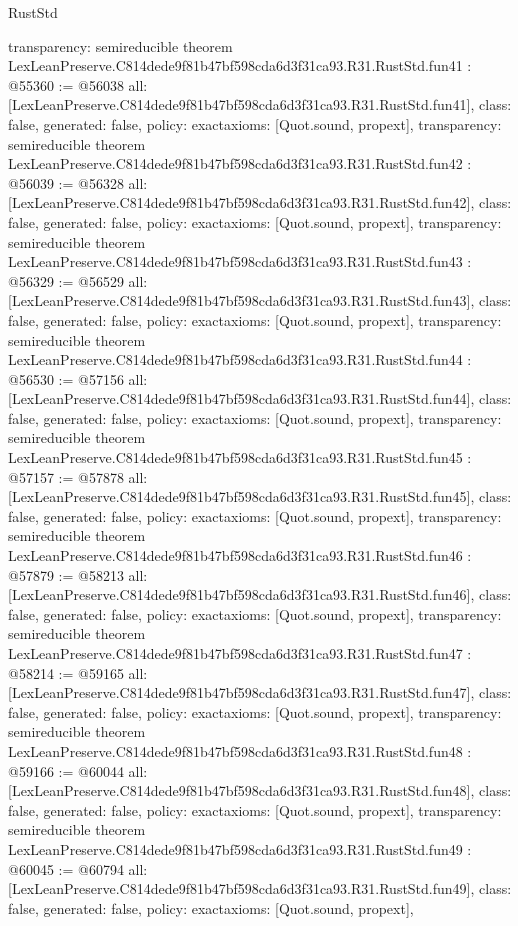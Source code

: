 \begin{lexlean}{RustStd}
\begin{coremodule}
{  transparency: semireducible
}
theorem LexLeanPreserve.C814dede9f81b47bf598cda6d3f31ca93.R31.RustStd.fun41 : @55360 := @56038 {
  all: [LexLeanPreserve.C814dede9f81b47bf598cda6d3f31ca93.R31.RustStd.fun41],
  class: false,
  generated: false,
  policy: exact{axioms: [Quot.sound, propext]},
  transparency: semireducible
}
theorem LexLeanPreserve.C814dede9f81b47bf598cda6d3f31ca93.R31.RustStd.fun42 : @56039 := @56328 {
  all: [LexLeanPreserve.C814dede9f81b47bf598cda6d3f31ca93.R31.RustStd.fun42],
  class: false,
  generated: false,
  policy: exact{axioms: [Quot.sound, propext]},
  transparency: semireducible
}
theorem LexLeanPreserve.C814dede9f81b47bf598cda6d3f31ca93.R31.RustStd.fun43 : @56329 := @56529 {
  all: [LexLeanPreserve.C814dede9f81b47bf598cda6d3f31ca93.R31.RustStd.fun43],
  class: false,
  generated: false,
  policy: exact{axioms: [Quot.sound, propext]},
  transparency: semireducible
}
theorem LexLeanPreserve.C814dede9f81b47bf598cda6d3f31ca93.R31.RustStd.fun44 : @56530 := @57156 {
  all: [LexLeanPreserve.C814dede9f81b47bf598cda6d3f31ca93.R31.RustStd.fun44],
  class: false,
  generated: false,
  policy: exact{axioms: [Quot.sound, propext]},
  transparency: semireducible
}
theorem LexLeanPreserve.C814dede9f81b47bf598cda6d3f31ca93.R31.RustStd.fun45 : @57157 := @57878 {
  all: [LexLeanPreserve.C814dede9f81b47bf598cda6d3f31ca93.R31.RustStd.fun45],
  class: false,
  generated: false,
  policy: exact{axioms: [Quot.sound, propext]},
  transparency: semireducible
}
theorem LexLeanPreserve.C814dede9f81b47bf598cda6d3f31ca93.R31.RustStd.fun46 : @57879 := @58213 {
  all: [LexLeanPreserve.C814dede9f81b47bf598cda6d3f31ca93.R31.RustStd.fun46],
  class: false,
  generated: false,
  policy: exact{axioms: [Quot.sound, propext]},
  transparency: semireducible
}
theorem LexLeanPreserve.C814dede9f81b47bf598cda6d3f31ca93.R31.RustStd.fun47 : @58214 := @59165 {
  all: [LexLeanPreserve.C814dede9f81b47bf598cda6d3f31ca93.R31.RustStd.fun47],
  class: false,
  generated: false,
  policy: exact{axioms: [Quot.sound, propext]},
  transparency: semireducible
}
theorem LexLeanPreserve.C814dede9f81b47bf598cda6d3f31ca93.R31.RustStd.fun48 : @59166 := @60044 {
  all: [LexLeanPreserve.C814dede9f81b47bf598cda6d3f31ca93.R31.RustStd.fun48],
  class: false,
  generated: false,
  policy: exact{axioms: [Quot.sound, propext]},
  transparency: semireducible
}
theorem LexLeanPreserve.C814dede9f81b47bf598cda6d3f31ca93.R31.RustStd.fun49 : @60045 := @60794 {
  all: [LexLeanPreserve.C814dede9f81b47bf598cda6d3f31ca93.R31.RustStd.fun49],
  class: false,
  generated: false,
  policy: exact{axioms: [Quot.sound, propext]},
}
\end{coremodule}
\end{lexlean}
